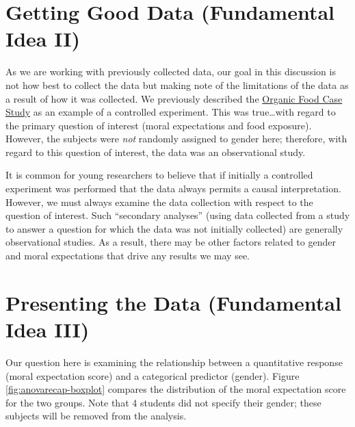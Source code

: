 \documentclass[]{book}
\theoremstyle{definition}
\theoremstyle{definition}
\theoremstyle{definition}
\theoremstyle{remark}
\begin{document}
\section{Getting Good Data (Fundamental Idea
II)}\label{getting-good-data-fundamental-idea-ii-1}

As we are working with previously collected data, our goal in this
discussion is not how best to collect the data but making note of the
limitations of the data as a result of how it was collected. We
previously described the \protect\hyperlink{CaseOrganic}{Organic Food
Case Study} as an example of a controlled experiment. This was
true\ldots{}with regard to the primary question of interest (moral
expectations and food exposure). However, the subjects were \emph{not}
randomly assigned to gender here; therefore, with regard to this
question of interest, the data was an observational study.

It is common for young researchers to believe that if initially a
controlled experiment was performed that the data always permits a
causal interpretation. However, we must always examine the data
collection with respect to the question of interest. Such ``secondary
analyses'' (using data collected from a study to answer a question for
which the data was not initially collected) are generally observational
studies. As a result, there may be other factors related to gender and
moral expectations that drive any results we may see.

\section{Presenting the Data (Fundamental Idea
III)}\label{presenting-the-data-fundamental-idea-iii-1}

Our question here is examining the relationship between a quantitative
response (moral expectation score) and a categorical predictor (gender).
Figure \ref{fig:anovarecap-boxplot} compares the distribution of the
moral expectation score for the two groups. Note that 4 students did not
specify their gender; these subjects will be removed from the analysis.
\end{document}
